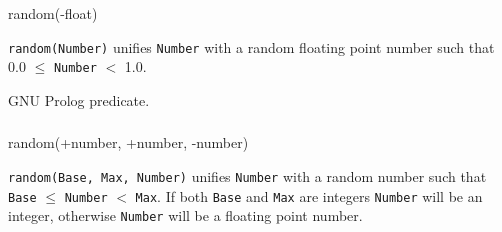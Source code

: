 \subsubsection{}

\begin{TemplatesOneCol}
random(-float)

\end{TemplatesOneCol}

\Description

\texttt{random(Number)} unifies \texttt{Number} with a random floating point
number such that 0.0 $\leq$ \texttt{Number} $<$ 1.0.

\begin{PlErrors}


\end{PlErrors}

\Portability

GNU Prolog predicate.

\subsubsection{}

\begin{TemplatesOneCol}
random(+number, +number, -number)

\end{TemplatesOneCol}

\Description

\texttt{random(Base, Max, Number)} unifies \texttt{Number} with a random
number such that \texttt{Base} $\leq$ \texttt{Number} $<$ \texttt{Max}. If
both \texttt{Base} and \texttt{Max} are integers \texttt{Number} will be an
integer, otherwise \texttt{Number} will be a floating point number.

\begin{PlErrors}






\end{PlErrors}

